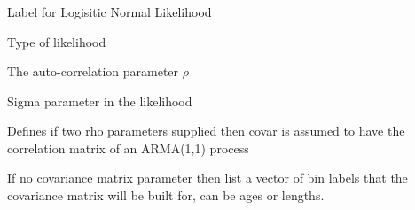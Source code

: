 
\subsubsection[Binomial]{}

\subsubsection[Binomial Approx]{}

\subsubsection[Dirichlet]{}

\subsubsection[Log Normal]{}

\subsubsection[Log Normal With Q]{}

\subsubsection[Logistic Normal]{}

 {Label for Logisitic Normal Likelihood}

 {Type of likelihood}

 {The auto-correlation parameter $\rho$}

 {Sigma parameter in the likelihood}

 {Defines if two rho parameters supplied then covar is assumed to have the correlation matrix of an ARMA(1,1) process}

 {If no covariance matrix parameter then list a vector of bin labels that the covariance matrix will be built for, can be ages or lengths.}

